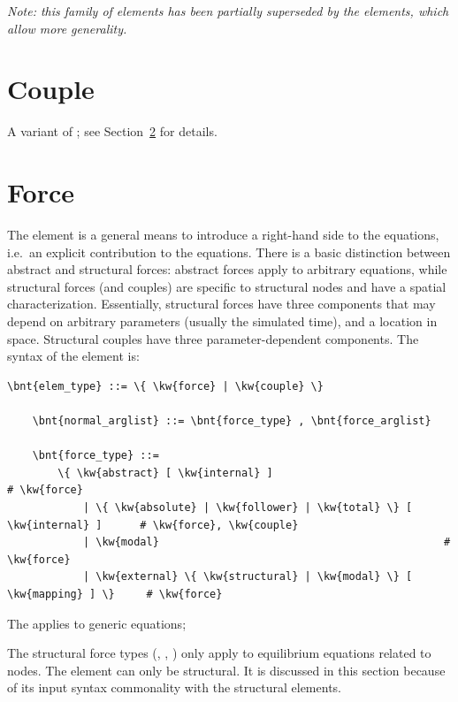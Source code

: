 {\em Note: this family of elements has been partially superseded by the
 elements, which allow more generality.}




\section{Couple}
A variant of ; see Section~\ref{sec:EL:FORCE} for details.







\section{Force}\label{sec:EL:FORCE}
The  element is a general means to introduce 
a right-hand side to the equations, i.e.\ an explicit contribution
to the equations.
There is a basic distinction between abstract and structural forces:
abstract forces apply to arbitrary equations, while structural forces
(and couples) are specific to structural nodes and have
a spatial characterization.
Essentially, structural forces have three components
that may depend on arbitrary parameters (usually the simulated time),
and a location in space.
Structural couples have three parameter-dependent components.
The syntax of the  element is:
\begin{Verbatim}[commandchars=\\\{\}]
    \bnt{elem_type} ::= \{ \kw{force} | \kw{couple} \}

    \bnt{normal_arglist} ::= \bnt{force_type} , \bnt{force_arglist}

    \bnt{force_type} ::=
        \{ \kw{abstract} [ \kw{internal} ]                                 # \kw{force}
            | \{ \kw{absolute} | \kw{follower} | \kw{total} \} [ \kw{internal} ]      # \kw{force}, \kw{couple}
            | \kw{modal}                                             # \kw{force}
            | \kw{external} \{ \kw{structural} | \kw{modal} \} [ \kw{mapping} ] \}     # \kw{force}
\end{Verbatim}
The   applies to generic equations;

The structural force types (, , )
only apply to equilibrium equations
related to  nodes.
The  element can only be structural.
It is discussed in this section because of its input syntax commonality 
with the structural  elements.

